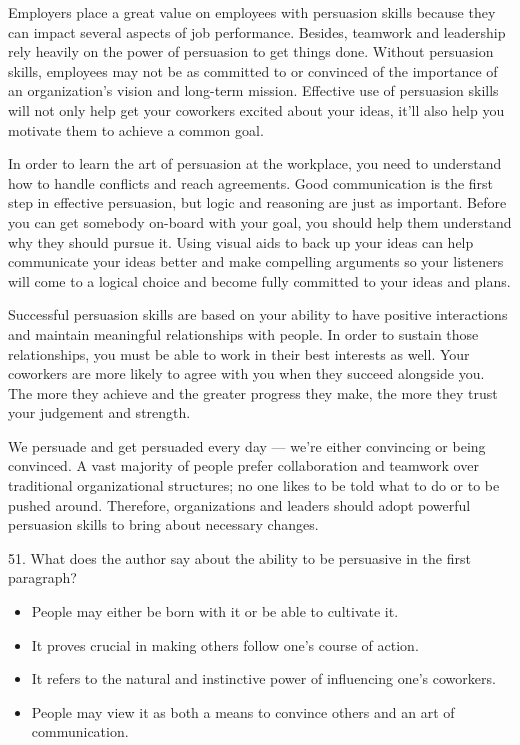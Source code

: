 \documentclass[UTF8,11pt]{ctexart}
\begin{document}
Employers place a great value on employees with persuasion skills because they can impact several aspects of job performance. Besides, teamwork and leadership rely heavily on the power of persuasion to get things done. Without persuasion skills, employees may not be as committed to or convinced of the importance of an organization’s vision and long-term mission. Effective use of persuasion skills will not only help get your coworkers excited about your ideas, it’ll also help you motivate them to achieve a common goal.


In order to learn the art of persuasion at the workplace, you need to understand how to handle conflicts and reach agreements. Good communication is the first step in effective persuasion, but logic and reasoning are just as important. Before you can get somebody on-board with your goal, you should help them understand why they should pursue it. Using visual aids to back up your ideas can help communicate your ideas better and make compelling arguments so your listeners will come to a logical choice and become fully committed to your ideas and plans.


Successful persuasion skills are based on your ability to have positive interactions and maintain meaningful relationships with people. In order to sustain those relationships, you must be able to work in their best interests as well. Your coworkers are more likely to agree with you when they succeed alongside you. The more they achieve and the greater progress they make, the more they trust your judgement and strength.


We persuade and get persuaded every day — we’re either convincing or being convinced. A vast majority of people prefer collaboration and teamwork over traditional organizational structures; no one likes to be told what to do or to be pushed around. Therefore, organizations and leaders should adopt powerful persuasion skills to bring about necessary changes.


51. What does the author say about the ability to be persuasive in the first paragraph?


\begin{itemize}[leftmargin=2em,itemsep=.2em,topsep=.4em]\item[A.] People may either be born with it or be able to cultivate it.
\item[B.] It proves crucial in making others follow one’s course of action.
\item[C.] It refers to the natural and instinctive power of influencing one’s coworkers.
\item[D.] People may view it as both a means to convince others and an art of communication.
\end{itemize}
\end{document}
